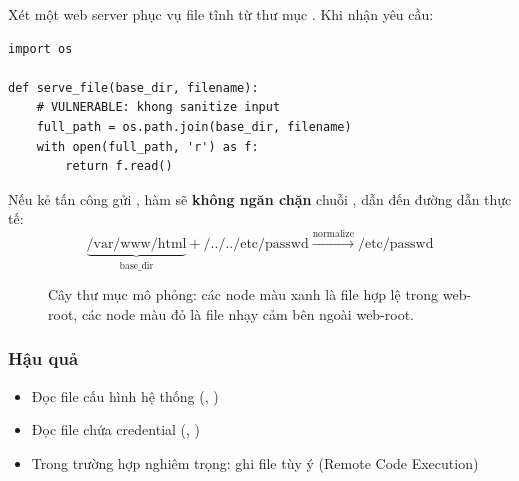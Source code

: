 \documentclass{nt521report}
\begin{document}
Xét một web server phục vụ file tĩnh từ thư mục . Khi nhận yêu cầu:

\begin{lstlisting}[style=Python, caption={Ví dụ code có lỗ hổng Path Traversal}]
import os

def serve_file(base_dir, filename):
    # VULNERABLE: khong sanitize input
    full_path = os.path.join(base_dir, filename)
    with open(full_path, 'r') as f:
        return f.read()
\end{lstlisting}

Nếu kẻ tấn công gửi , hàm  sẽ \textbf{không ngăn chặn} chuỗi , dẫn đến đường dẫn thực tế:
\[
  \underbrace{\text{/var/www/html}}_{\text{base\_dir}} + \text{/../../etc/passwd} \xrightarrow{\text{normalize}} \text{/etc/passwd}
\]

\begin{figure}[H]
  \centering
  \caption{Cây thư mục mô phỏng: các node màu xanh là file hợp lệ trong web-root, các node màu đỏ là file nhạy cảm bên ngoài web-root.}
  \label{fig:path-traversal-tree}
\end{figure}

\subsubsection{Hậu quả}

\begin{itemize}
  \item Đọc file cấu hình hệ thống (, )
  \item Đọc file chứa credential (, )
  \item Trong trường hợp nghiêm trọng: ghi file tùy ý (Remote Code Execution)
\end{itemize}
\end{document}
